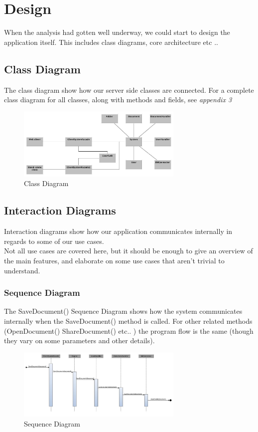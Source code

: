\documentclass[11pt]{article}
\begin{document}
\section{Design}
\label{sec-3}
When the analysis had gotten well underway, we could start to design the application itself. This includes class diagrams, core architecture etc ..
\subsection{Class Diagram}
\label{sec-3-1}
The class diagram show how our server side classes are connected. For a complete class diagram for all classes, along with methods and fields, see \emph{appendix 3}
\begin{figure}[H]
  		\centering
    	\includegraphics[width=300px]{images/LatestClassDiagram.jpg}
    	\caption{Class Diagram}
\end{figure}
\subsection{Interaction Diagrams}
\label{sec-3-2}
Interaction diagrams show how our application communicates internally in regards to some of our use cases. \\
Not all use cases are covered here, but it should be enough to give an overview of the main features, and elaborate on some use cases that aren't trivial to understand.
\subsubsection{Sequence Diagram}
\label{sec-3-2-1}
The SaveDocument() Sequence Diagram shows how the system communicates internally when the SaveDocument() method is called.
For other related methods (OpenDocument() ShareDocument() etc.. ) the program flow is the same (though they vary on some parameters and other details).
\begin{figure}[H]
  		\centering
    	\includegraphics[width=300px]{images/SequenceDiagram_SaveDocument.jpg}
    	\caption{Sequence Diagram}
\end{figure}
\end{document}
